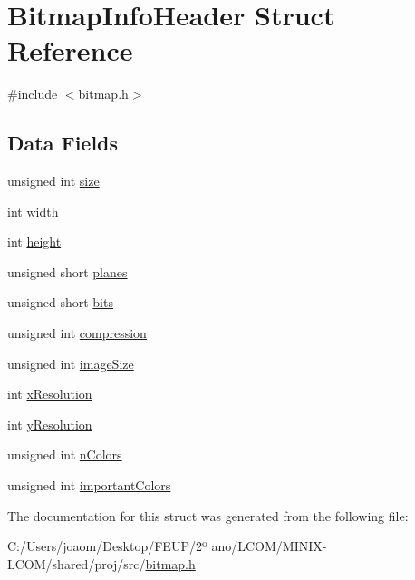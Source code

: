 \hypertarget{struct_bitmap_info_header}{}\section{Bitmap\+Info\+Header Struct Reference}
\label{struct_bitmap_info_header}


{\ttfamily \#include $<$bitmap.\+h$>$}

\subsection*{Data Fields}
\begin{DoxyCompactItemize}
\item 
unsigned int \mbox{\hyperlink{group__bitmap_gaac913b3a1f6ef005d66bf7a84428773e}{size}}
\item 
int \mbox{\hyperlink{group__bitmap_ga2474a5474cbff19523a51eb1de01cda4}{width}}
\item 
int \mbox{\hyperlink{group__bitmap_gad12fc34ce789bce6c8a05d8a17138534}{height}}
\item 
unsigned short \mbox{\hyperlink{group__bitmap_ga8c89d091e05544a82dc2398eed99634f}{planes}}
\item 
unsigned short \mbox{\hyperlink{group__bitmap_ga47d1d4d776f8fd3bb0f7dbc3c5aeb534}{bits}}
\item 
unsigned int \mbox{\hyperlink{group__bitmap_gad180079f62b44e49ec672c9ef6e078b3}{compression}}
\item 
unsigned int \mbox{\hyperlink{group__bitmap_gadcd57a0168319e747bc8099218d3822c}{image\+Size}}
\item 
int \mbox{\hyperlink{group__bitmap_gac6eaeb4c0876cf6cd899f41fe3c25ff5}{x\+Resolution}}
\item 
int \mbox{\hyperlink{group__bitmap_gaa2f350dd0bda750656d5db5f5e37b2b3}{y\+Resolution}}
\item 
unsigned int \mbox{\hyperlink{group__bitmap_gaed4506bad904845183194f199f1bdb98}{n\+Colors}}
\item 
unsigned int \mbox{\hyperlink{group__bitmap_ga8f7abfbc446b12f385d2b42c3b4fd9b0}{important\+Colors}}
\end{DoxyCompactItemize}


The documentation for this struct was generated from the following file\+:\begin{DoxyCompactItemize}
\item 
C\+:/\+Users/joaom/\+Desktop/\+F\+E\+U\+P/2º ano/\+L\+C\+O\+M/\+M\+I\+N\+I\+X-\/\+L\+C\+O\+M/shared/proj/src/\mbox{\hyperlink{bitmap_8h}{bitmap.\+h}}\end{DoxyCompactItemize}
